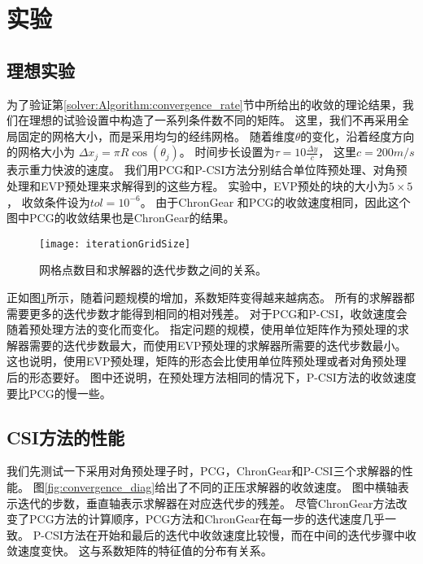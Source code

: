  




\section{实验} 
\label{solver:exp}
 
\subsection{理想实验}\label{solver:exp:ideal}

为了验证第\ref{solver:Algorithm:convergence_rate}节中所给出的收敛的理论结果，我们在理想的试验设置中构造了一系列条件数不同的矩阵。
这里，我们不再采用全局固定的网格大小，而是采用均匀的经纬网格。
随着维度$\theta$的变化，沿着经度方向的网格大小为 $\Delta x_j  = \pi R \cos (\theta_j)$。
时间步长设置为$\tau = 10\frac{\Delta y}{c}$， 这里$c = 200m/s$ 表示重力快波的速度\cite{smith2010parallel}。 
我们用PCG和P-CSI方法分别结合单位阵预处理、对角预处理和EVP预处理来求解得到的这些方程。
实验中，EVP预处的块的大小为$5\times5$， 收敛条件设为$tol = 10^{-6}$。 
由于ChronGear 和PCG的收敛速度相同，因此这个图中PCG的收敛结果也是ChronGear的结果。
  

\begin{figure} 
\vspace{5pt}
\centering
\texttt{[image: iterationGridSize]}
\caption[] {网格点数目和求解器的迭代步数之间的关系。\label{fig:iterationGridSize}}
\end{figure}

正如图\ref{fig:iterationGridSize}所示，随着问题规模的增加，系数矩阵变得越来越病态。
所有的求解器都需要更多的迭代步数才能得到相同的相对残差。
对于PCG和P-CSI，收敛速度会随着预处理方法的变化而变化。 
指定问题的规模，使用单位矩阵作为预处理的求解器需要的迭代步数最大，而使用EVP预处理的求解器所需要的迭代步数最小。 
这也说明，使用EVP预处理，矩阵的形态会比使用单位阵预处理或者对角预处理后的形态要好。 
图中还说明，在预处理方法相同的情况下，P-CSI方法的收敛速度要比PCG的慢一些。 



 
\subsection{CSI方法的性能}
 
我们先测试一下采用对角预处理子时，PCG，ChronGear和P-CSI三个求解器的性能。
图\ref{fig:convergence_diag}给出了不同的正压求解器的收敛速度。
图中横轴表示迭代的步数，垂直轴表示求解器在对应迭代步的残差。 
尽管ChronGear方法改变了PCG方法的计算顺序，PCG方法和ChronGear在每一步的迭代速度几乎一致。
P-CSI方法在开始和最后的迭代中收敛速度比较慢，而在中间的迭代步骤中收敛速度变快。
这与系数矩阵的特征值的分布有关系。 


